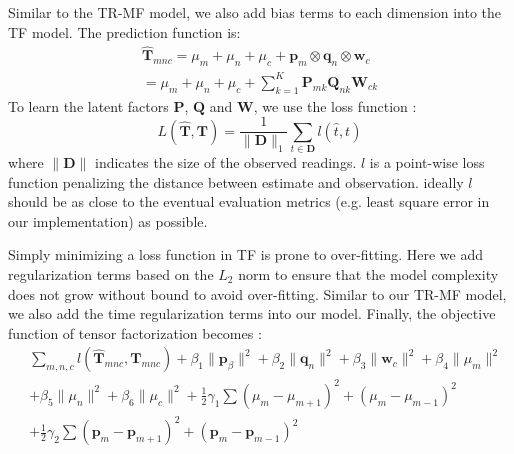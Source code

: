 Similar to the TR-MF model, we also add bias terms to each dimension into the TF model. The prediction function is:
\begin{equation*}
\begin{aligned}
\mathbf{\hat{T}}_{mnc}=\mu_m+\mu_n+\mu_c + \mathbf{p}_m \otimes \mathbf{q}_n\otimes \mathbf{w}_c
\\=\mu_m+\mu_n+\mu_c+\sum\limits_{k=1}^{K}\mathbf{P}_{m k} \mathbf{Q}_{n k} \mathbf{W}_{c k}
\end{aligned}
\end{equation*}
To learn the latent factors $\mathbf{P}$, $\mathbf{Q}$ and $\mathbf{W}$, we use the loss function :
\begin{equation*}
L(\mathbf{\hat{T}},\mathbf{T})=\frac{1}{\|\mathbf{D}\|_1} \sum\limits_{t\in \mathbf{D}}  l(\hat{t},t)
\end{equation*}
where $\|\mathbf{D}\|$ indicates the size of the observed readings.
$l$ is a point-wise loss function penalizing the distance between estimate and observation.
ideally $l$ should be as close to the eventual evaluation metrics (e.g. least square error in our implementation) as possible.

Simply minimizing a loss function in TF is prone to over-fitting. Here we add regularization terms based on the $L_2$ norm to ensure that the model complexity does not grow without bound to avoid over-fitting.
Similar to our TR-MF model, we also add the time regularization terms into our model.
Finally, the objective function of tensor factorization becomes :\\
\begin{equation*}
\begin{aligned}
&\sum\limits_{m, n, c} l( \hat{\mathbf{T}}_{mnc}, \mathbf{T}_{mnc} )+\beta_1\|\mathbf{p}_{\beta}\|^2+\beta_2\|\mathbf{q}_n\|^2+\beta_3\|\mathbf{w}_c\|^2+\beta_4\|\mu_m\|^2\\
&+\beta_5\|\mu_n\|^2+\beta_6\|\mu_c\|^2+\frac{1}{2}\gamma_1\sum(\mu_m-\mu_{m+1})^2+(\mu_m-\mu_{m-1})^2
\\&
+\frac{1}{2}\gamma_2\sum(\mathbf{p}_m-\mathbf{p}_{m+1})^2+(\mathbf{p}_m-\mathbf{p}_{m-1})^2
\end{aligned}
\end{equation*}


